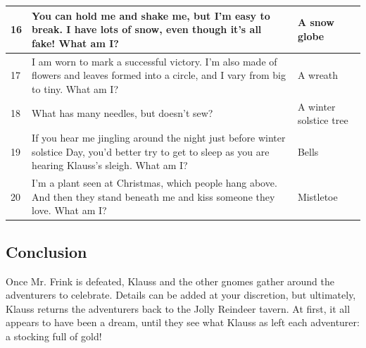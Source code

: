 \documentclass{article}
\begin{document}
\begin{table}[H]
\begin{tabular}{|m{2em}|m{35em}|m{10em}|}
			16 & You can hold me and shake me, but I’m easy to break. I have lots of snow, even though it’s all fake! What am I? & A snow globe \\
			\hline
			17 &	I am worn to mark a successful victory. I’m also made of flowers and leaves formed into a circle, and I vary from big to tiny. What am I? & A wreath \\
			\hline
			18 &	What has many needles, but doesn’t sew? &  A winter solstice tree \\
			\hline
			19 &	If you hear me jingling around the night just before winter solstice Day, you’d better try to get to sleep as you are hearing Klauss’s sleigh. What am I? & Bells \\
			\hline
			20 &	I’m a plant seen at Christmas, which people hang above. And then they stand beneath me and kiss someone they love. What am I? & Mistletoe \\
			\hline
		\end{tabular}
	\end{table}

	\begin{multicols*}{2}
		
	\section{Conclusion}
		Once Mr. Frink is defeated, Klauss and the other gnomes gather around the adventurers to celebrate. Details can be added at your discretion, but ultimately, Klauss returns the adventurers back to the Jolly Reindeer tavern. At first, it all appears to have been a dream, until they see what Klauss as left each adventurer: a stocking full of gold!
		
	\pagebreak
	
\end{multicols*}
	
\end{document}
